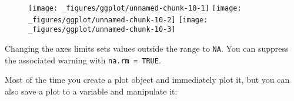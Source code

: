\begin{Shaded}
\begin{Highlighting}[]
\StringTok{  }\NormalTok{(} \NormalTok{)}

\StringTok{  }\NormalTok{(} \NormalTok{) +}\StringTok{ }
\StringTok{  }\NormalTok{(}\NormalTok{, }\NormalTok{) +}\StringTok{ }
\StringTok{  }\NormalTok{(}\NormalTok{, }\NormalTok{)}
  
\StringTok{  }\NormalTok{(} \NormalTok{, } \NormalTok{) +}\StringTok{ }
\StringTok{  }\NormalTok{(}\NormalTok{, }\NormalTok{)}
\end{Highlighting}
\end{Shaded}

\begin{figure}[H]
  \texttt{[image: \_figures/ggplot/unnamed-chunk-10-1]}%
  \texttt{[image: \_figures/ggplot/unnamed-chunk-10-2]}%
  \texttt{[image: \_figures/ggplot/unnamed-chunk-10-3]}
\end{figure}

Changing the axes limits sets values outside the range to \texttt{NA}.
You can suppress the associated warning with \texttt{na.rm\ =\ TRUE}.


Most of the time you create a plot object and immediately plot it, but
you can also save a plot to a variable and manipulate it:

\begin{Shaded}
\begin{Highlighting}[]
\StringTok{ } 
\StringTok{  }\NormalTok{()}
\end{Highlighting}
\end{Shaded}

